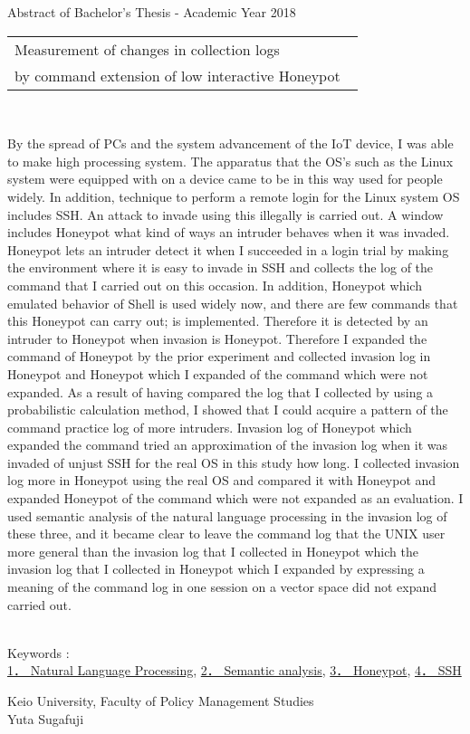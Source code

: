 Abstract of Bachelor's Thesis - Academic Year 2018
\begin{center}
\begin{large}
\begin{tabular}{|M{0.97\linewidth}|}
    \hline
        Measurement of changes in collection logs\\
        by command extension of low interactive Honeypot
    \hline
\end{tabular}
\end{large}
\end{center}

~ \\
\renewcommand{\baselinestretch}{0.9}

By the spread of PCs and the system advancement of the IoT device, I was able to make high processing system. The apparatus that the OS's such as the Linux system were equipped with on a device came to be in this way used for people widely. In addition, technique to perform a remote login for the Linux system OS includes SSH. An attack to invade using this illegally is carried out.
A window includes Honeypot what kind of ways an intruder behaves when it was invaded. Honeypot lets an intruder detect it when I succeeded in a login trial by making the environment where it is easy to invade in SSH and collects the log of the command that I carried out on this occasion. In addition, Honeypot which emulated behavior of Shell is used widely now, and there are few commands that this Honeypot can carry out; is implemented. Therefore it is detected by an intruder to Honeypot when invasion is Honeypot. Therefore I expanded the command of Honeypot by the prior experiment and collected invasion log in Honeypot and Honeypot which I expanded of the command which were not expanded. As a result of having compared the log that I collected by using a probabilistic calculation method, I showed that I could acquire a pattern of the command practice log of more intruders. Invasion log of Honeypot which expanded the command tried an approximation of the invasion log when it was invaded of unjust SSH for the real OS in this study how long. I collected invasion log more in Honeypot using the real OS and compared it with Honeypot and expanded Honeypot of the command which were not expanded as an evaluation. I used semantic analysis of the natural language processing in the invasion log of these three, and it became clear to leave the command log that the UNIX user more general than the invasion log that I collected in Honeypot which the invasion log that I collected in Honeypot which I expanded by expressing a meaning of the command log in one session on a vector space did not expand carried out.

\renewcommand{\baselinestretch}{1.0}

~ \\
Keywords : \\
\underline{1． Natural Language Processing},
\underline{2． Semantic analysis},
\underline{3． Honeypot},
\underline{4． SSH}
\begin{flushright}
Keio University, Faculty of Policy Management Studies\\
Yuta Sugafuji
\end{flushright}

